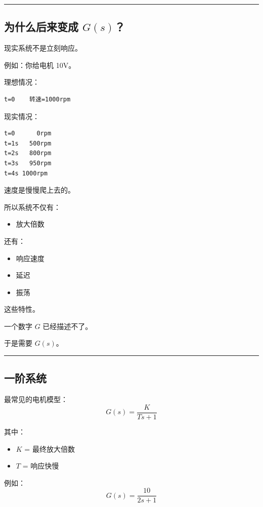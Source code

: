 \documentclass[UTF8,a4paper,11pt]{ctexart}
\begin{document}
\bigskip\noindent\rule{\linewidth}{0.4pt}\bigskip

\subsection{为什么后来变成 $G(s)$？}

现实系统不是立刻响应。

例如：你给电机 10V。

理想情况：

\begin{verbatim}
t=0    转速=1000rpm
\end{verbatim}

现实情况：

\begin{verbatim}
t=0      0rpm
t=1s   500rpm
t=2s   800rpm
t=3s   950rpm
t=4s 1000rpm
\end{verbatim}

速度是慢慢爬上去的。

所以系统不仅有：

\begin{itemize}
  \item 放大倍数
\end{itemize}

还有：

\begin{itemize}
  \item 响应速度
  \item 延迟
  \item 振荡
\end{itemize}

这些特性。

一个数字 $G$ 已经描述不了。

于是需要 $G(s)$。

\bigskip\noindent\rule{\linewidth}{0.4pt}\bigskip

\subsection{一阶系统}

最常见的电机模型：
\[
G(s)=\frac{K}{Ts+1}
\]

其中：

\begin{itemize}
  \item $K$ = 最终放大倍数
  \item $T$ = 响应快慢
\end{itemize}

例如：
\[
G(s)=\frac{10}{2s+1}
\]
\end{document}
